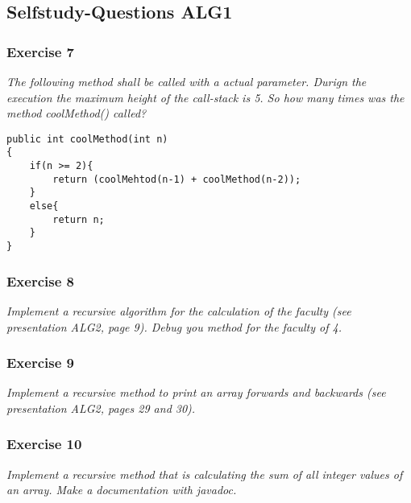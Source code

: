 \subsection{Selfstudy-Questions ALG1}

\subsubsection*{Exercise 7}
\textit{The following method shall be called with a actual parameter.
Durign the execution the maximum height of the call-stack is 5.
So how many times was the method coolMethod() called?} \\

\begin{lstlisting}
public int coolMethod(int n)
{
	if(n >= 2){
		return (coolMehtod(n-1) + coolMethod(n-2));
	} 
	else{
		return n;
	}
}
\end{lstlisting}

\subsubsection*{Exercise 8}
\textit{Implement a recursive algorithm for the calculation of the
faculty (see presentation ALG2, page 9). Debug you method for the
faculty of 4.} \\

\subsubsection*{Exercise 9}
\textit{Implement a recursive method to print an array forwards and
 backwards (see presentation ALG2, pages 29 and 30).} \\

\subsubsection*{Exercise 10}
\textit{Implement a recursive method that is calculating the sum of
all integer values of an array. Make a documentation with javadoc.} \\

